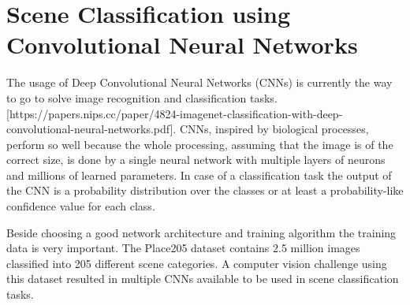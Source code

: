 \section{Scene Classification using Convolutional Neural Networks}

The usage of Deep Convolutional Neural Networks (CNNs) is currently the way to go to solve image recognition and classification tasks. [https://papers.nips.cc/paper/4824-imagenet-classification-with-deep-convolutional-neural-networks.pdf]. CNNs, inspired by biological processes, perform so well because the whole processing, assuming that the image is of the correct size, is done by a single neural network with multiple layers of neurons and millions of learned parameters. In case of a classification task the output of the CNN is a probability distribution over the classes or at least a probability-like confidence value for each class.

Beside choosing a good network architecture and training algorithm the training data is very important. The Place205 dataset contains 2.5 million images classified into 205 different scene categories. A computer vision challenge using this dataset resulted in multiple CNNs available to be used in scene classification tasks.